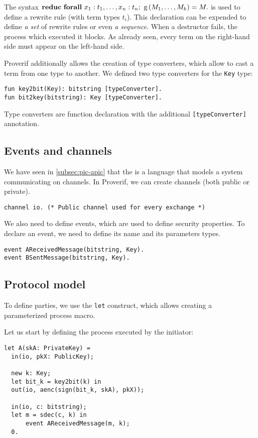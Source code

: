 The syntax $\mathbf{reduc\ forall}\ x_1: t_1, \ldots, x_n: t_n;\ \mbox{g}\left(M_1, \ldots, M_k\right) = M.$ is used to define a rewrite rule (with term types $t_i$). This declaration can be expended to define \textit{a set} of rewrite rules or even \textit{a sequence}. When a destructor fails, the process which executed it blocks. As already seen, every term on the right-hand side must appear on the left-hand side.

Proverif additionally allows the creation of type converters, which allow to cast a term from one type to another. We defined two type converters for the \lstinline{Key} type:

\begin{lstlisting}
fun key2bit(Key): bitstring [typeConverter].
fun bit2key(bitstring): Key [typeConverter].
\end{lstlisting}

Type converters are function declaration with the additional \lstinline{[typeConverter]} annotation.

\subsection{Events and channels}
We have seen in \cref{subsec:pic-apic} that the \apic{} is a language that models a system communicating on channels. In Proverif, we can create channels (both public or private).

\begin{lstlisting}
channel io. (* Public channel used for every exchange *)
\end{lstlisting}

We also need to define events, which are used to define security properties. To declare an event, we need to define its name and its parameters types.

\begin{lstlisting}
event AReceivedMessage(bitstring, Key).
event BSentMessage(bitstring, Key).
\end{lstlisting}

\subsection{Protocol model}
To define parties, we use the \lstinline{let} construct, which allows creating a parameterized process macro.

Let us start by defining the process executed by the initiator:

\begin{lstlisting}
let A(skA: PrivateKey) =
  in(io, pkX: PublicKey);

  new k: Key;
  let bit_k = key2bit(k) in
  out(io, aenc(sign(bit_k, skA), pkX));
  
  in(io, c: bitstring);
  let m = sdec(c, k) in
      event AReceivedMessage(m, k);
  0.
\end{lstlisting}

